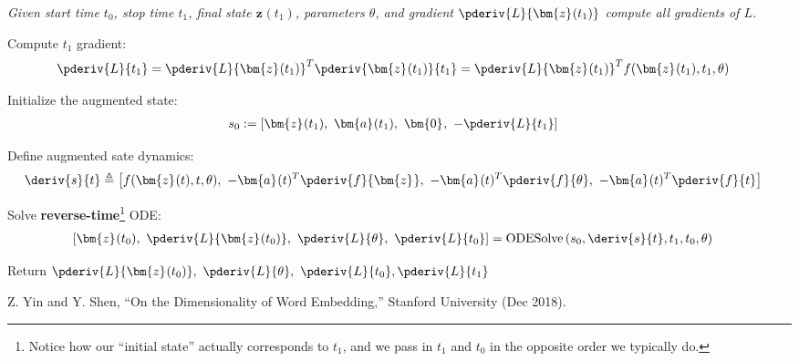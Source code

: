 \documentclass[11pt]{article}
\renewcommand\vec[2][]{\bm{#2}_{#1}}
\begin{document}
\begin{algorithm}
	{\small\itshape 
		Given start time $t_0$, stop time $t_1$, final state $\vec{z}(t_1)$, parameters $\theta$, and gradient $\pderiv{L}{\vec{z}(t_1)}$ compute all gradients of $L$. 
}
	
	\tcblower 
	
	\begin{compactenum}
		\item Compute $t_1$ gradient:
		\begin{align}
			\pderiv{L}{t_1}
				&= \pderiv{L}{\vec{z}(t_1)}^T \pderiv{\vec{z}(t_1)}{t_1}
				=  \pderiv{L}{\vec{z}(t_1)}^T f(\vec z (t_1), t_1, \theta)
		\end{align}
		
		\item Initialize the augmented state:
		\begin{align}
			s_0
				&:= \left[
					\vec z (t_1),~
					\vec a (t_1),~
					\vec 0,~
					- \pderiv{L}{t_1}
				\right]
		\end{align}
		
		
		\item Define augmented sate dynamics:
		\begin{align}
			\deriv{ s }{ t }
				&\triangleq \left[
					f(\vec z (t), t, \theta),~
					-\vec a (t)^T \pderiv{f}{\vec z},~
					-\vec a (t)^T \pderiv{f}{\theta},~
					-\vec a (t)^T \pderiv{f}{t}
				\right]
		\end{align}
		
		\item Solve \textbf{reverse-time}\footnote{Notice how our ``initial state'' actually corresponds to $t_1$, and we pass in $t_1$ and $t_0$ in the opposite order we typically do.} ODE:
		\begin{align}
			\left[
				\vec z (t_0),~
				\pderiv{L}{\vec z (t_0)},~
				\pderiv{L}{\theta},~
				\pderiv{L}{t_0}
			\right]
				&= \text{ODESolve}\left(
					s_0, \deriv{s}{t}, t_1, t_0, \theta
				\right)
		\end{align}
		
		\item Return $	\pderiv{L}{\vec z (t_0)},~\pderiv{L}{\theta},~\pderiv{L}{t_0}, \pderiv{L}{t_1} $
	\end{compactenum}
\end{algorithm}






\vspace{-1em}
{\footnotesize Z. Yin and Y. Shen, ``On the Dimensionality of Word Embedding,'' Stanford University (Dec 2018).}
\end{document}
